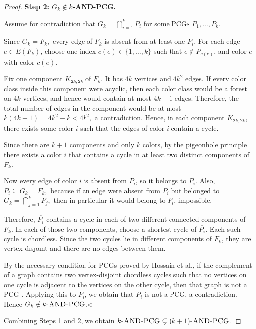\documentclass[a4paper,UKenglish,cleveref,autoref,thm-restate]{socg-lipics-v2021}
\begin{document}
\begin{proof}
\medskip
\noindent\textbf{Step 2: \(G_k\notin k\)-AND-PCG.}

Assume for contradiction that
\(
G_k=\bigcap_{i=1}^k P_i
\)
for some \textsc{PCGs} \(P_1,\dots,P_k\).



Since
\(
\overline{G_k}=F_k,
\)
every edge of \(F_k\) is absent from at least one \(P_i\). For each edge \(e\in E(F_k)\),
choose one index
\(
c(e)\in\{1,\dots,k\}
\)
such that \(e\notin P_{c(e)}\), and color \(e\) with color \(c(e)\).

Fix one component \(K_{2k,2k}\) of \(F_k\). It has \(4k\) vertices and \(4k^2\) edges.
If every color class inside this component were acyclic, then each color class would be a
forest on \(4k\) vertices, and hence would contain at most \(4k-1\) edges. Therefore, the
total number of edges in the component would be at most
\(
k(4k-1)=4k^2-k<4k^2,
\)
a contradiction. Hence, in each component \(K_{2k,2k}\), there exists some color \(i\)
such that the edges of color \(i\) contain a cycle.

Since there are \(k+1\) components and only \(k\) colors, by the pigeonhole principle
there exists a color \(i\) that contains a cycle in at least two distinct components of
\(F_k\).

Now every edge of color \(i\) is absent from \(P_i\), so it belongs to \(\overline{P_i}\).
Also,
\(
\overline{P_i}\subseteq \overline{G_k}=F_k,
\)
because if an edge were absent from \(P_i\) but belonged to
\(
G_k=\bigcap_{j=1}^k P_j,
\)
then in particular it would belong to \(P_i\), impossible.

Therefore, \(\overline{P_i}\) contains a cycle in each of two different connected
components of \(F_k\). In each of those two components, choose a shortest cycle of
\(\overline{P_i}\). Each such cycle is chordless. Since the two cycles lie in different
components of \(F_k\), they are vertex-disjoint and there are no edges between them.

By the necessary condition for \textsc{PCG}s proved by Hossain et al., if the complement
of a graph contains two vertex-disjoint chordless cycles such that no vertices on one cycle is adjacent to the vertices on the other cycle, then that graph is not a
\textsc{PCG} \cite{Hossain2016ANCAI,Rahman2020ASOA}. Applying this to \(P_i\), we obtain
that \(P_i\) is not a \textsc{PCG}, a contradiction. Hence \(G_k\notin k\textsc{-AND-\textsc{PCG}}\).\hfill$\triangleleft$

Combining Steps 1 and 2, we obtain
\(
k\textsc{-AND-\textsc{PCG}} \subsetneq (k+1)\textsc{-AND-\textsc{PCG}}.
\)
\end{proof}
\end{document}

